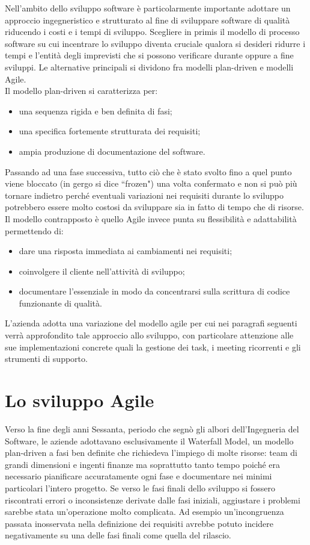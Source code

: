 \documentclass[target=bach,aauheader=,style=]{thud}
\begin{document}
Nell'ambito dello sviluppo software è particolarmente importante adottare un approccio ingegneristico e strutturato al fine di sviluppare software di
qualità riducendo i costi e i tempi di sviluppo. Scegliere in primis il modello di processo software su cui incentrare lo
sviluppo diventa cruciale qualora si desideri ridurre i tempi e l'entità degli imprevisti che si possono verificare durante oppure a fine sviluppi. Le alternative principali si dividono fra modelli
plan-driven e modelli Agile.\\ Il modello plan-driven si caratterizza per:
\begin{itemize}
    \item una sequenza rigida e ben definita di fasi;
    \item una specifica fortemente strutturata dei requisiti;
    \item ampia produzione di documentazione del software.
\end{itemize}
Passando ad una fase successiva, tutto ciò che è stato svolto fino a quel punto viene bloccato (in gergo si dice ``frozen") una volta confermato e non si può più tornare indietro perché eventuali
variazioni nei requisiti durante lo sviluppo potrebbero essere molto costosi da sviluppare sia in fatto di tempo che di risorse.\\ Il modello contrapposto è quello Agile invece punta su flessibilità
e adattabilità permettendo di:
\begin{itemize}
    \item dare una risposta immediata ai cambiamenti nei requisiti;
    \item coinvolgere il cliente nell'attività di sviluppo;
    \item documentare l'essenziale in modo da concentrarsi sulla scrittura di codice funzionante di qualità.
\end{itemize}
L'azienda adotta una variazione del modello agile per cui nei paragrafi seguenti verrà approfondito tale approccio allo sviluppo, con particolare attenzione alle sue implementazioni concrete quali la
gestione dei task, i meeting ricorrenti e gli strumenti di supporto.

\section{Lo sviluppo Agile}

Verso la fine degli anni Sessanta, periodo che segnò gli albori dell'Ingegneria del Software, le aziende adottavano esclusivamente il Waterfall Model,
un modello plan-driven a fasi ben definite che richiedeva l'impiego di molte risorse: team di grandi dimensioni e ingenti finanze ma soprattutto tanto tempo
poiché era necessario pianificare accuratamente ogni fase e documentare nei minimi particolari l'intero progetto. Se verso le fasi finali dello
sviluppo si fossero riscontrati errori o inconsistenze derivate dalle fasi iniziali, aggiustare i problemi sarebbe stata un'operazione molto complicata.
Ad esempio un'incongruenza passata inosservata nella definizione dei requisiti avrebbe potuto incidere negativamente su una delle fasi finali come quella del rilascio.
\end{document}
